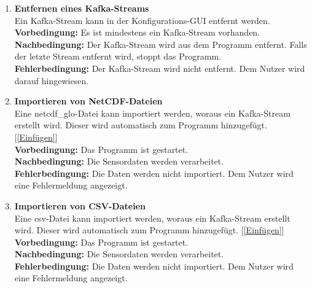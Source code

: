 \begin{enumerate}[label=\textbf{PF\arabic{enumi}0}]
	\item \textbf{Entfernen eines Kafka-Streams}\\
		Ein Kafka-Stream kann in der Konfigurations-GUI entfernt werden.\\
		\textbf{Vorbedingung:} Es ist mindestens ein Kafka-Stream vorhanden.\\
		\textbf{Nachbedingung:} Der Kafka-Stream wird aus dem Programm entfernt. Falls der letzte Stream entfernt wird, stoppt das Programm.\\
		\textbf{Fehlerbedingung:} Der Kafka-Stream wird nicht entfernt. Dem Nutzer wird darauf hingewiesen.
		
		
		
	\item \textbf{Importieren von NetCDF-Dateien}\\
		Eine \gls{netcdf_glo}-Datei kann importiert werden, woraus ein Kafka-Stream erstellt wird. Dieser wird automatisch zum Programm hinzugefügt. [\ref{Einfügen}]\\
		\textbf{Vorbedingung:} Das Programm ist gestartet.\\
		\textbf{Nachbedingung:} Die Sensordaten werden verarbeitet.\\
		\textbf{Fehlerbedingung:} Die Daten werden nicht importiert. Dem Nutzer wird eine Fehlermeldung angezeigt.
		
	\item \textbf{Importieren von CSV-Dateien}\\
		Eine \gls{csv}-Datei kann importiert werden, woraus ein Kafka-Stream erstellt wird. Dieser wird automatisch zum Programm hinzugefügt. [\ref{Einfügen}]\\
		\textbf{Vorbedingung:} Das Programm ist gestartet.\\
		\textbf{Nachbedingung:} Die Sensordaten werden verarbeitet.\\
		\textbf{Fehlerbedingung:} Die Daten werden nicht importiert. Dem Nutzer wird eine Fehlermeldung angezeigt.
		

\end{enumerate}
